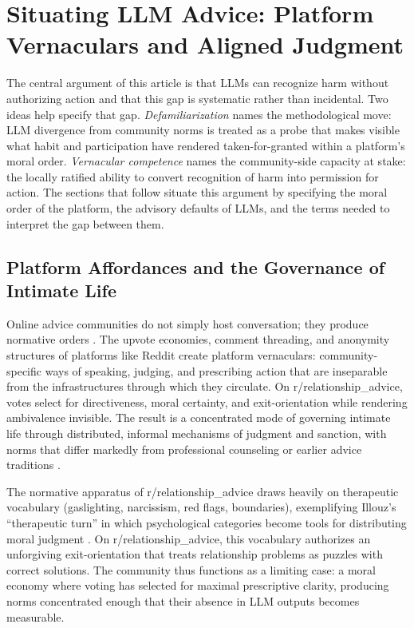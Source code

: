 \section{Situating LLM Advice: Platform Vernaculars and Aligned Judgment}
\label{sec:bg}

The central argument of this article is that LLMs can recognize harm without authorizing action and that this gap is systematic rather than incidental. Two ideas help specify that gap. \textit{Defamiliarization} names the methodological move: LLM divergence from community norms is treated as a probe that makes visible what habit and participation have rendered taken-for-granted within a platform's moral order. \textit{Vernacular competence} names the community-side capacity at stake: the locally ratified ability to convert recognition of harm into permission for action. The sections that follow situate this argument by specifying the moral order of the platform, the advisory defaults of LLMs, and the terms needed to interpret the gap between them.

\subsection{Platform Affordances and the Governance of Intimate Life}

Online advice communities do not simply host conversation; they produce normative orders \citep{gillespie2018custodians}. The upvote economies, comment threading, and anonymity structures of platforms like Reddit create platform vernaculars: community-specific ways of speaking, judging, and prescribing action that are inseparable from the infrastructures through which they circulate. On r/relationship\_advice, votes select for directiveness, moral certainty, and exit-orientation while rendering ambivalence invisible. The result is a concentrated mode of governing intimate life through distributed, informal mechanisms of judgment and sanction, with norms that differ markedly from professional counseling or earlier advice traditions \citep{reagle2025}.

The normative apparatus of r/relationship\_advice draws heavily on therapeutic vocabulary (gaslighting, narcissism, red flags, boundaries), exemplifying Illouz's ``therapeutic turn'' in which psychological categories become tools for distributing moral judgment \citep{illouz2008saving, rose1999governing}. On r/relationship\_advice, this vocabulary authorizes an unforgiving exit-orientation that treats relationship problems as puzzles with correct solutions. The community thus functions as a limiting case: a moral economy where voting has selected for maximal prescriptive clarity, producing norms concentrated enough that their absence in LLM outputs becomes measurable.

